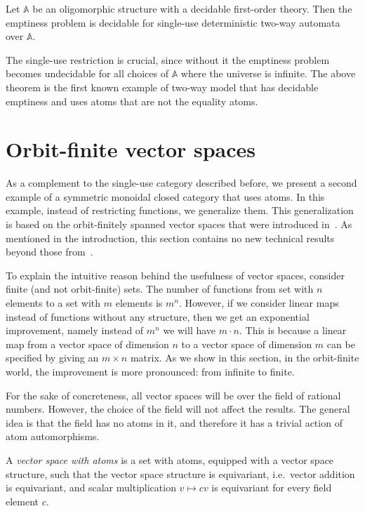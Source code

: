 \documentclass[10pt,a4paper]{amsart}
\numberwithin{equation}{section}
\theoremstyle{plain}
\newcommand{\atoms}{\mathbb A}
\begin{document}
\begin{theorem}\label{thm:two-way-automata}
    Let $\atoms$ be an oligomorphic structure with a decidable first-order theory. Then the emptiness problem is decidable for single-use deterministic  two-way automata over $\atoms$.
\end{theorem}

The single-use restriction is crucial, since without it the emptiness problem becomes undecidable for all choices of $\atoms$ where the universe is infinite. The above theorem is the first known example of two-way model that has decidable emptiness and uses atoms that are not the equality atoms. 

\section{Orbit-finite vector spaces}
As a complement to the single-use category described before, we present a second example of a symmetric monoidal closed category that  uses atoms. In this example, instead of restricting functions, we generalize them. This generalization is based on the  orbit-finitely spanned vector spaces that were introduced in~\cite{bojanczykKM21OrbitFiniteVector}. As mentioned in the introduction,  this section contains no new technical results beyond those from~\cite{bojanczykKM21OrbitFiniteVector}. 

To explain the intuitive reason behind the usefulness of vector spaces, consider finite (and not orbit-finite) sets. The number of functions from set with $n$ elements to a set with $m$ elements is $m^n$. However, if we consider linear maps instead of functions without any structure, then we get an exponential improvement, namely instead of $m^n$ we will have $m \cdot n$. 
This is because a linear map from a vector space of dimension $n$ to a vector space of dimension $m$ can be specified by giving an $m \times n$ matrix. As we show in this section,  in the orbit-finite world, the improvement is more pronounced: from infinite to finite.

For the sake of concreteness, all  vector spaces will be over the field of rational numbers. However, the choice of the field will not affect the results. The general idea is that the field has no atoms in it, and therefore it has a trivial action of atom automorphisms. 
\begin{definition}
    A \emph{vector space with atoms} is a set with atoms, equipped with a vector space structure, such that the vector space structure is equivariant, i.e.~vector addition is equivariant, and  scalar multiplication $v \mapsto cv$ is equivariant for every field element $c$.
\end{definition}
\end{document}
